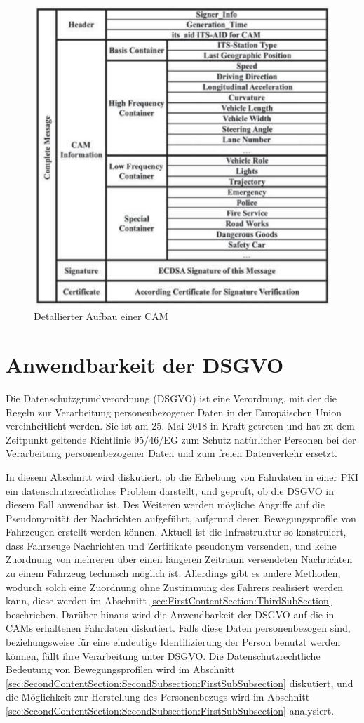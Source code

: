 \begin{figure}
	\centering
	\includegraphics[width=0.4\linewidth]{images/CAM}
	\caption[Detallierter Aufbau einer CAM]{Detallierter Aufbau einer CAM \footnotemark}
	\label{fig:cam}
\end{figure}

\section{Anwendbarkeit der DSGVO}
\label{sec:SecondContentSection:SecondSubsection}

Die Datenschutzgrundverordnung (DSGVO) ist eine Verordnung, mit der die Regeln zur Verarbeitung personenbezogener Daten in der Europäischen Union vereinheitlicht werden. Sie ist am 25. Mai 2018 in Kraft getreten und hat zu dem Zeitpunkt geltende Richtlinie 95/46/EG zum Schutz natürlicher Personen bei der Verarbeitung personenbezogener Daten und zum freien Datenverkehr ersetzt. 

In diesem Abschnitt wird diskutiert, ob die Erhebung von Fahrdaten in einer PKI ein datenschutzrechtliches Problem darstellt, und geprüft, ob die DSGVO in diesem Fall anwendbar ist. Des Weiteren werden mögliche Angriffe auf die Pseudonymität der Nachrichten aufgeführt, aufgrund deren Bewegungsprofile von Fahrzeugen erstellt werden können. Aktuell ist die Infrastruktur so konstruiert, dass Fahrzeuge Nachrichten und Zertifikate pseudonym versenden, und keine Zuordnung von mehreren über einen längeren Zeitraum versendeten Nachrichten zu einem Fahrzeug technisch möglich ist. Allerdings gibt es andere Methoden, wodurch solch eine Zuordnung ohne Zustimmung des Fahrers realisiert werden kann, diese werden im Abschnitt \ref{sec:FirstContentSection:ThirdSubSection} beschrieben. Darüber hinaus wird die Anwendbarkeit der DSGVO auf die in CAMs erhaltenen Fahrdaten diskutiert. Falls diese Daten personenbezogen sind, beziehungsweise für eine eindeutige Identifizierung der Person benutzt werden können, fällt ihre Verarbeitung unter DSGVO. Die Datenschutzrechtliche Bedeutung von Bewegungsprofilen wird im Abschnitt \ref{sec:SecondContentSection:SecondSubsection:FirstSubSubsection} diskutiert, und die Möglichkeit zur Herstellung des Personenbezugs wird im Abschnitt \ref{sec:SecondContentSection:SecondSubsection:FirstSubSubsection} analysiert.

